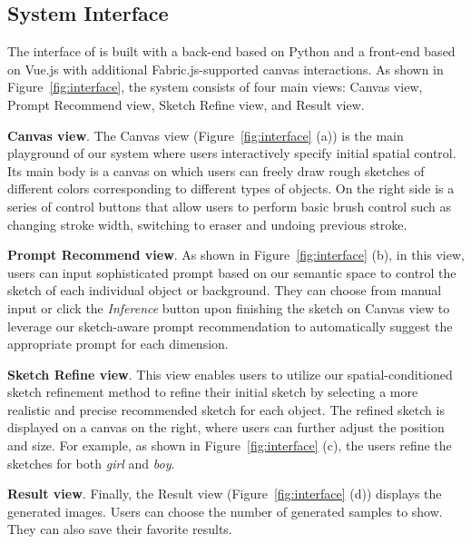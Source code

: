 \subsection{System Interface}\label{ssec:system}
The interface of \tool is built with a back-end based on Python and a front-end based on Vue.js with additional Fabric.js-supported canvas interactions.  
As shown in Figure~\ref{fig:interface}, the \tool system consists of four main views: Canvas view, Prompt Recommend view, Sketch Refine view, and Result view.

\textbf{Canvas view}.
The Canvas view (Figure~\ref{fig:interface} (a)) is the main playground of our system where users interactively specify initial spatial control.
Its main body is a canvas on which users can freely draw rough sketches of different colors corresponding to different types of objects. 
On the right side is a series of control buttons that allow users to perform basic brush control such as changing stroke width, switching to eraser and undoing previous stroke.

\textbf{Prompt Recommend view}. 
As shown in Figure~\ref{fig:interface} (b), in this view, users can input sophisticated prompt based on our semantic space to control the sketch of each individual object or background.
They can choose from manual input or click the \emph{Inference} button upon finishing the sketch on Canvas view to leverage our sketch-aware prompt recommendation to automatically suggest the appropriate prompt for each dimension.

\textbf{Sketch Refine view}.
This view enables users to utilize our spatial-conditioned sketch refinement method to refine their initial sketch by selecting a more realistic and precise recommended sketch for each object.
The refined sketch is displayed on a canvas on the right, where users can further adjust the position and size.
For example, as shown in Figure~\ref{fig:interface} (c), the users refine the sketches for both \emph{girl} and \emph{boy}.

\textbf{Result view}.
Finally, the Result view (Figure~\ref{fig:interface} (d)) displays the generated images. 
Users can choose the number of generated samples to show.
They can also save their favorite results.


